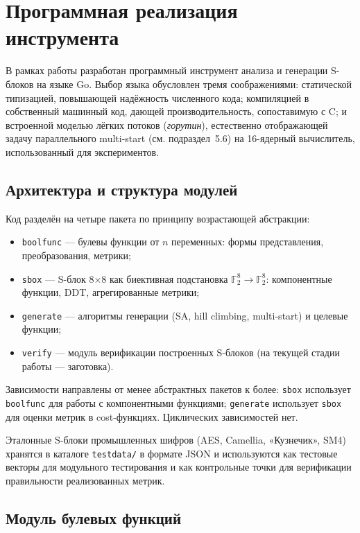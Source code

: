 \newpage
\section{Программная реализация инструмента}

В рамках работы разработан программный инструмент анализа и
генерации S-блоков на языке Go. Выбор языка обусловлен тремя
соображениями: статической типизацией, повышающей надёжность
численного кода; компиляцией в собственный машинный код, дающей
производительность, сопоставимую с C; и встроенной моделью лёгких
потоков (\emph{горутин}), естественно отображающей задачу
параллельного multi-start (см. подраздел~5.6) на 16-ядерный
вычислитель, использованный для экспериментов.

\subsection{Архитектура и структура модулей}

Код разделён на четыре пакета по принципу возрастающей абстракции:

\begin{itemize}
    \item \texttt{boolfunc} — булевы функции от $n$ переменных:
        формы представления, преобразования, метрики;
    \item \texttt{sbox} — S-блок 8$\times$8 как биективная
        подстановка $\mathbb{F}_2^8 \to \mathbb{F}_2^8$:
        компонентные функции, DDT, агрегированные метрики;
    \item \texttt{generate} — алгоритмы генерации (SA, hill climbing,
        multi-start) и целевые функции;
    \item \texttt{verify} — модуль верификации построенных S-блоков
        (на текущей стадии работы — заготовка).
\end{itemize}

Зависимости направлены от менее абстрактных пакетов к более:
\texttt{sbox} использует \texttt{boolfunc} для работы с компонентными
функциями; \texttt{generate} использует \texttt{sbox} для оценки
метрик в cost-функциях. Циклических зависимостей нет.

Эталонные S-блоки промышленных шифров (AES, Camellia, «Кузнечик»,
SM4) хранятся в каталоге \texttt{testdata/} в формате JSON и
используются как тестовые векторы для модульного тестирования и
как контрольные точки для верификации правильности реализованных
метрик.

\subsection{Модуль булевых функций}

